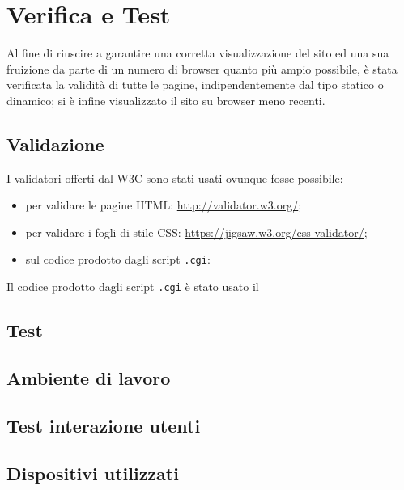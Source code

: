 \section{Verifica e Test}{
	Al fine di riuscire a garantire una corretta visualizzazione del sito ed una sua fruizione da parte di un numero di browser quanto più ampio possibile, è stata verificata la validità di tutte le pagine, indipendentemente dal tipo statico o dinamico; si è infine visualizzato il sito su browser meno recenti.
	\subsection{Validazione}{
		I validatori offerti dal W3C sono stati usati ovunque fosse possibile:
		\begin{itemize}\itemsep1pt
			\item per validare le pagine HTML: \url{http://validator.w3.org/};
			\item per validare i fogli di stile CSS: \url{https://jigsaw.w3.org/css-validator/};
			\item sul codice prodotto dagli script \texttt{.cgi}: \url{}
		\end{itemize}
		Il codice prodotto dagli script \texttt{.cgi} è stato usato il 
	}
	\subsection{Test}{
		
	}
	\subsection{Ambiente di lavoro}
	\subsection{Test interazione utenti}
	\subsection{Dispositivi utilizzati}
}
